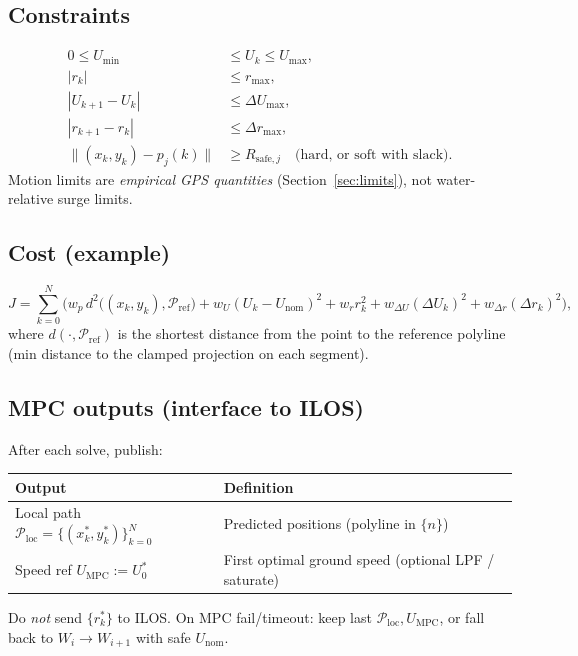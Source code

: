 \documentclass[11pt,a4paper]{article}
\begin{document}
\subsection{Constraints}
\[
\begin{aligned}
0 \le U_{\min} &\le U_k \le U_{\max}, \\
|r_k| &\le r_{\max}, \\
|U_{k+1}-U_k| &\le \Delta U_{\max}, \\
|r_{k+1}-r_k| &\le \Delta r_{\max}, \\
\|(x_k,y_k)-p_j(k)\| &\ge R_{\mathrm{safe},j}
\quad\text{(hard, or soft with slack).}
\end{aligned}
\]
Motion limits are \emph{empirical GPS quantities}
(Section~\ref{sec:limits}), not water-relative surge limits.

\subsection{Cost (example)}
\[
J=\sum_{k=0}^{N}\Big(
w_p\, d^2\!\big((x_k,y_k),\mathcal{P}_{\mathrm{ref}}\big)
+ w_U(U_k-U_{\mathrm{nom}})^2
+ w_r r_k^2
+ w_{\Delta U}(\Delta U_k)^2
+ w_{\Delta r}(\Delta r_k)^2
\Big),
\]
where \(d(\cdot,\mathcal{P}_{\mathrm{ref}})\) is the shortest distance from the
point to the reference polyline (min distance to the clamped projection on
each segment).

\subsection{MPC outputs (interface to ILOS)}
After each solve, publish:

\begin{center}
\small
\begin{tabular}{@{}ll@{}}
\toprule
Output & Definition \\
\midrule
Local path \(\mathcal{P}_{\mathrm{loc}}=\{(x_k^*,y_k^*)\}_{k=0}^{N}\)
  & Predicted positions (polyline in \(\{n\}\)) \\
Speed ref \(U_{\mathrm{MPC}}:=U_0^*\)
  & First optimal ground speed (optional LPF / saturate) \\
\bottomrule
\end{tabular}
\end{center}

Do \emph{not} send \(\{r_k^*\}\) to ILOS.
On MPC fail/timeout: keep last \(\mathcal{P}_{\mathrm{loc}},U_{\mathrm{MPC}}\),
or fall back to \(W_i\to W_{i+1}\) with safe \(U_{\mathrm{nom}}\).
\end{document}
